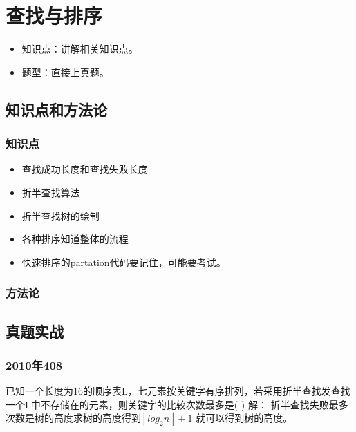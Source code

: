 
\chapter{查找与排序}
\label{chap13}

\begin{itemize}[noitemsep,topsep=0pt,parsep=0pt,partopsep=0pt]
	\item 知识点：讲解相关知识点。
	\item 题型：直接上真题。
\end{itemize}

\section{知识点和方法论}

\subsection{知识点}
\begin{itemize}[noitemsep,topsep=0pt,parsep=0pt,partopsep=0pt]
	\item 查找成功长度和查找失败长度
	\item 折半查找算法
	\item 折半查找树的绘制
	\item 各种排序知道整体的流程
	\item 快速排序的partation代码要记住，可能要考试。
\end{itemize}

\subsection{方法论}

\section{真题实战}

\subsection{2010年408}
已知一个长度为16的顺序表L，七元素按关键字有序排列，若采用折半查找发查找一个L中不存储在的元素，则关键字的比较次数最多是(  )\newline
解：\newline
折半查找失败最多次数是树的高度求树的高度得到$\left \lfloor log_2{n} \right \rfloor + 1$ 就可以得到树的高度。\newline


